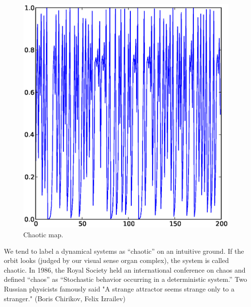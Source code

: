 \documentclass[11pt]{article}
\begin{document}
\begin{figure}[h]
  \begin{center}
    \includegraphics[scale=0.5]{logistic_map_mu4_x02.eps}
  \end{center}
  \caption{
    Chaotic map.
  }
  \label{fig:logistic_map_chaotic}
\end{figure}

We tend to label a dynamical systems as ``chaotic'' on an intuitive ground.
If the orbit looks (judged by our visual sense organ complex), the system is called chaotic.
In 1986, the Royal Society held an international conference on chaos and defined ``chaos'' as ``Stochastic behavior occurring in a deterministic system.'' \cite{stewart}
Two Russian physicists famously said "A strange attractor seems strange only to a stranger."
(Boris Chirikov, Felix Izrailev)\cite{lorenzbook}



\end{document}
